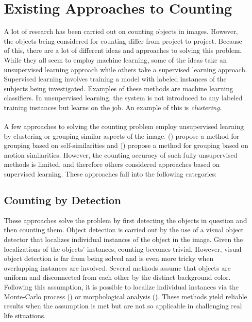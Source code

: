 
\bigskip

\goodbreak

\section{Existing Approaches to Counting}
A lot of research has been carried out on counting objects in images. However, the objects being considered for counting differ from project to project. Because of this, there are a lot of different ideas and approaches to solving this problem. While they all seem to employ machine learning, some of the ideas take an unsupervised learning approach while others take a supervised learning approach. Supervised learning involves training a model with labeled instances of the subjects being investigated. Examples of these methods are machine learning classifiers. In unsupervised learning, the system is not introduced to any labeled training instances but learns on the job. An example of this is \textit{clustering}.\\ \\
%
A few approaches to solving the counting problem employ unsupervised learning by clustering or grouping similar aspects of the image. (\cite{REF14}) propose a method for grouping based on self-similarities and (\cite{REF15}) propose a method for grouping based on motion similarities. However, the counting accuracy of such fully unsupervised methods is limited, and therefore others considered approaches based on supervised learning. These approaches fall into the following categories:

\subsection{Counting by Detection}
These approaches solve the problem by first detecting the objects in question and then counting them. Object detection is carried out by the use of a visual object detector that localizes individual instances of the object in the image. Given the localizations of the objects' instances, counting becomes trivial. However, visual object detection is far from being solved and is even more tricky when overlapping instances are involved. Several methods assume that objects are uniform and disconnected from each other by the distinct background color. Following this assumption, it is possible to localize individual instances via the Monte-Carlo process (\cite{REF16}) or morphological analysis (\cite{REF17}). These methods yield reliable results when the assumption is met but are not so applicable in challenging real life situations. 

